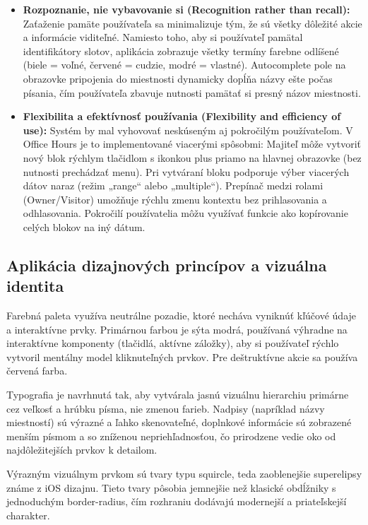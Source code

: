 \begin{itemize}
    \item \textbf{Rozpoznanie, nie vybavovanie si (Recognition rather than recall):} Zaťaženie pamäte používateľa sa minimalizuje tým, že sú všetky dôležité akcie a informácie viditeľné. Namiesto toho, aby si používateľ pamätal identifikátory slotov, aplikácia zobrazuje všetky termíny farebne odlíšené (biele = voľné, červené = cudzie, modré = vlastné). Autocomplete pole na obrazovke pripojenia do miestnosti dynamicky dopĺňa názvy ešte počas písania, čím používateľa zbavuje nutnosti pamätať si presný názov miestnosti.
    
    \item \textbf{Flexibilita a efektívnosť používania (Flexibility and efficiency of use):} Systém by mal vyhovovať neskúseným aj pokročilým používateľom. V Office Hours je to implementované viacerými spôsobmi: Majiteľ môže vytvoriť nový blok rýchlym tlačidlom s ikonkou plus priamo na hlavnej obrazovke (bez nutnosti prechádzať menu). Pri vytváraní bloku podporuje výber viacerých dátov naraz (režim „range“ alebo „multiple“). Prepínač medzi rolami (Owner/Visitor) umožňuje rýchlu zmenu kontextu bez prihlasovania a odhlasovania. Pokročilí používatelia môžu využívať funkcie ako kopírovanie celých blokov na iný dátum.
\end{itemize}

\subsection{Aplikácia dizajnových princípov a vizuálna identita}

Farebná paleta využíva neutrálne pozadie, ktoré necháva vyniknúť kľúčové údaje a interaktívne prvky. Primárnou farbou je sýta modrá, používaná výhradne na interaktívne komponenty (tlačidlá, aktívne záložky), aby si používateľ rýchlo vytvoril mentálny model kliknuteľných prvkov. Pre deštruktívne akcie sa používa červená farba.
    
Typografia je navrhnutá tak, aby vytvárala jasnú vizuálnu hierarchiu primárne cez veľkosť a hrúbku písma, nie zmenou farieb. Nadpisy (napríklad názvy miestností) sú výrazné a ľahko skenovateľné, doplnkové informácie sú zobrazené menším písmom a so zníženou nepriehľadnosťou, čo prirodzene vedie oko od najdôležitejších prvkov k detailom.

Výrazným vizuálnym prvkom sú tvary typu squircle, teda zaoblenejšie superelipsy známe z iOS dizajnu. Tieto tvary pôsobia jemnejšie než klasické obdĺžniky s jednoduchým border-radius, čím rozhraniu dodávajú modernejší a priateľskejší charakter.

